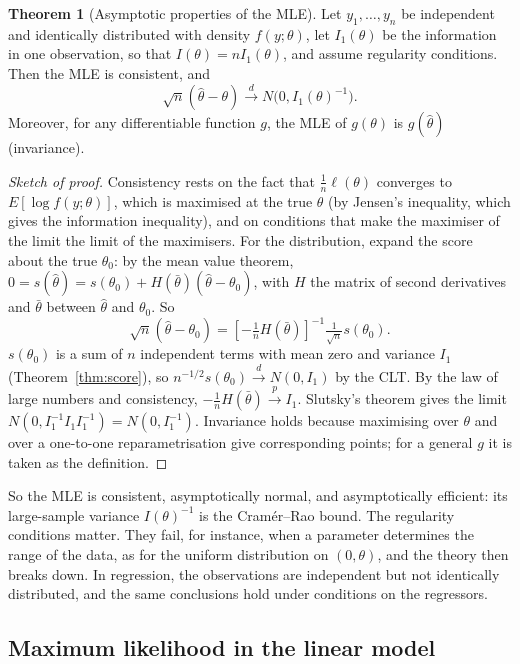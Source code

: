 \documentclass[11pt,a4paper]{article}
\numberwithin{equation}{section}
\theoremstyle{definition}
\newtheorem{thm}{Theorem}[subsection]
\begin{document}
\begin{thm}[Asymptotic properties of the MLE]
\label{thm:mleasym}
Let $y_1, \dots, y_n$ be independent and identically distributed with density $f(y; \theta)$, let $I_1(\theta)$ be the information in one observation, so
that $I(\theta) = nI_1(\theta)$, and assume regularity conditions. Then the MLE is consistent, and
\[
\sqrt n(\hat\theta - \theta) \xrightarrow{d} N\bigl(0, I_1(\theta)^{-1}\bigr) .
\]
Moreover, for any differentiable function $g$, the MLE of $g(\theta)$ is $g(\hat\theta)$ (invariance).
\end{thm}

\begin{proof}[Sketch of proof]
Consistency rests on the fact that $\frac1n\ell(\theta)$ converges to $E[\log f(y; \theta)]$, which is maximised at the true $\theta$ (by Jensen's inequality,
which gives the information inequality), and on conditions that make the maximiser of the limit the limit of the maximisers. For the
distribution, expand the score about the true $\theta_0$: by the mean value theorem, $0 = s(\hat\theta) = s(\theta_0) + H(\bar\theta)(\hat\theta - \theta_0)$, with $H$
the matrix of second derivatives and $\bar\theta$ between $\hat\theta$ and $\theta_0$. So
\[
\sqrt n(\hat\theta - \theta_0) = \left[-\tfrac1nH(\bar\theta)\right]^{-1}\tfrac{1}{\sqrt n}s(\theta_0) .
\]
$s(\theta_0)$ is a sum of $n$ independent terms with mean zero and variance $I_1$ (Theorem~\ref{thm:score}), so $n^{-1/2}s(\theta_0) \xrightarrow{d} N(0, I_1)$ by
the CLT. By the law of large numbers and consistency, $-\frac1nH(\bar\theta) \xrightarrow{p} I_1$. Slutsky's theorem gives the limit
$N(0, I_1^{-1}I_1I_1^{-1}) = N(0, I_1^{-1})$. Invariance holds because maximising over $\theta$ and over a one-to-one reparametrisation give
corresponding points; for a general $g$ it is taken as the definition.
\end{proof}

So the MLE is consistent, asymptotically normal, and asymptotically efficient: its large-sample variance $I(\theta)^{-1}$ is the Cram\'er--Rao bound. The
regularity conditions matter. They fail, for instance, when a parameter determines the range of the data, as for the uniform distribution on
$(0, \theta)$, and the theory then breaks down. In regression, the observations are independent but not identically distributed, and the same
conclusions hold under conditions on the regressors.

\subsection{Maximum likelihood in the linear model}
\label{ssec:mllinear}
\end{document}
